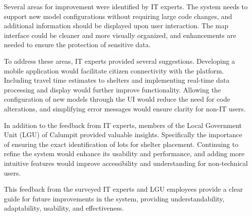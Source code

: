 	Several areas for improvement were identified by IT experts. The system needs to support new model configurations without requiring large code changes, and additional information should be displayed upon user interaction. The map interface could be cleaner and more visually organized, and enhancements are needed to ensure the protection of sensitive data.
	
	To address these areas, IT experts provided several suggestions. Developing a mobile application would facilitate citizen connectivity with the platform. Including travel time estimates to shelters and implementing real-time data processing and display would further improve functionality. Allowing the configuration of new models through the UI would reduce the need for code alterations, and simplifying error messages would ensure clarity for non-IT users.

	In addition to the feedback from IT experts, members of the Local Government Unit (LGU) of Calumpit provided valuable insights. Specifically the importance of ensuring the exact identification of lots for shelter placement. Continuing to refine the system would enhance its usability and performance, and adding more intuitive features would improve accessibility and understanding for non-technical users.
	
	This feedback from the surveyed IT experts and LGU employees provide a clear guide for future improvements in the system, providing understandability, adaptability, usability, and effectiveness.
	
